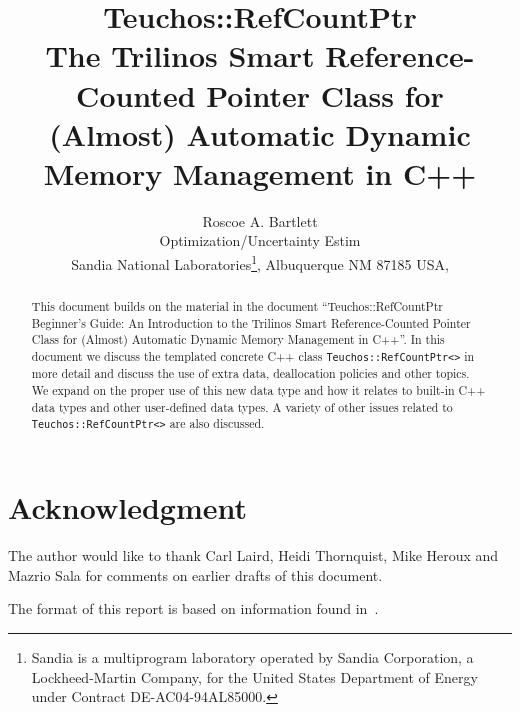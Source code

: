 \documentclass[pdf,ps2pdf,11pt]{SANDreport}
\title{\center
{\Huge\bf Teuchos::RefCountPtr}\\[1.5ex]
The Trilinos Smart Reference-Counted Pointer Class
for (Almost) Automatic Dynamic Memory Management in C++
}
\author{
Roscoe A. Bartlett \\ Optimization/Uncertainty Estim \\
Sandia National Laboratories\footnote{
Sandia is a multiprogram laboratory operated by Sandia Corporation, a
Lockheed-Martin Company, for the United States Department of Energy
under Contract DE-AC04-94AL85000.}, Albuquerque NM 87185 USA, \\
}
\date{}
\begin{document}
\raggedright

\maketitle

%

%
\begin{abstract}
%
This document builds on the material in the document ``Teuchos::RefCountPtr
Beginner's Guide: An Introduction to the Trilinos Smart Reference-Counted
Pointer Class for (Almost) Automatic Dynamic Memory Management in C++''.  In
this document we discuss the templated concrete C++ class
{}\texttt{Teuchos::RefCountPtr<>} in more detail and discuss the use of extra
data, deallocation policies and other topics.  We expand on the proper use of
this new data type and how it relates to built-in C++ data types and other
user-defined data types.  A variety of other issues related to
\texttt{Teuchos::RefCountPtr<>} are also discussed.
%
\end{abstract}
%

%
\clearpage
\section*{Acknowledgment}
The author would like to thank Carl Laird, Heidi Thornquist, Mike
Heroux and Mazrio Sala for comments on earlier drafts of this
document.

The format of this report is based on information found
in~\cite{Sand98-0730}.

%
\clearpage
\tableofcontents
\listoffigures

\end{document}
